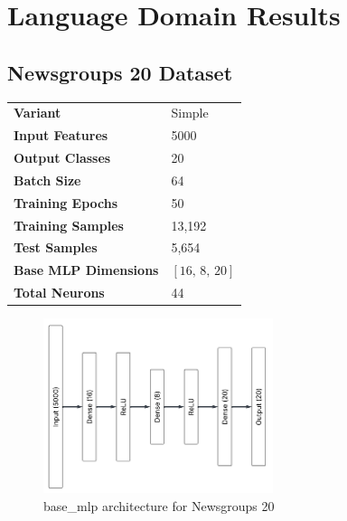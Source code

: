 \section{Language Domain Results}

\subsection{Newsgroups 20 Dataset}

\begin{tabular}{@{}ll@{}}
\textbf{Variant} & Simple \\
\textbf{Input Features} & 5000 \\
\textbf{Output Classes} & 20 \\
\textbf{Batch Size} & 64 \\
\textbf{Training Epochs} & 50 \\
\textbf{Training Samples} & 13,192 \\
\textbf{Test Samples} & 5,654 \\
\textbf{Base MLP Dimensions} & $[16,\, 8,\, 20]$ \\
\textbf{Total Neurons} & 44 \\
\end{tabular}

\begin{figure}[H]
    \centering
    \includegraphics[height=0.28\textheight,width=0.6\textwidth]{Figures/Results/Newsgroups/Newsgroups_base_mlp_architecture.png} 
    \captionsetup{justification=centering}  %
    \caption{base\_mlp architecture for Newsgroups 20}
    \label{fig:newsgroupsMlpBaseArch}
\end{figure}

